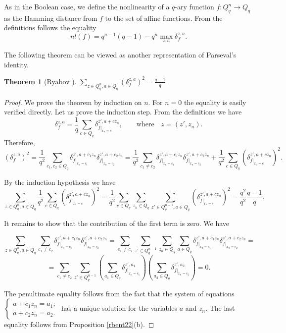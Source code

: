 \documentclass[11pt]{article}
\newtheorem{theorem}{Theorem}[section]
\theoremstyle{definition}
\begin{document}
{{{As in the Boolean case, we define the nonlinearity of a $q$-ary
function $f:Q_q^n\rightarrow Q_q$ as the Hamming distance from $f$ to
the set of affine functions. From the definitions follows the equality
\begin{equation}\label{eqplat1}
nl(f)=q^{n-1}(q-1)-q^n\max\limits_{z,a}\delta^{z,a}_f.
\end{equation}

The following theorem can be viewed as another representation of Parseval's identity.

\begin{theorem}[Ryabov \cite{Ryabov20}]\label{rbent1}
$\sum\limits_{z\in Q^n_q ,a\in
Q_q}(\delta^{z,a}_f)^2=\frac{q-1}{q}$.
\end{theorem}
\begin{proof}
We prove the theorem by induction on $n$. For $n=0$ the equality is easily verified
directly. Let us prove the induction step. From the definitions we have
$$\delta^{z,a}_f=\frac1q\sum\limits_{c\in
Q_q}\delta_{f|_{x_n=c}}^{z',a+cz_n},\qquad \text{where}\quad
z=(z',z_n).$$ Therefore,
$$(\delta^{z,a}_f)^2=\frac{1}{q^2}\sum\limits_{c_1,c_2\in
Q_q}\delta_{f|_{x_n=c_1}}^{z',a+c_1z_n}\delta_{f|_{x_n=c_2}}^{z',a+c_2z_n}=
\frac{1}{q^2}\sum\limits_{c_1\neq c_2
}\delta_{f|_{x_n=c_1}}^{z',a+c_1z_n}\delta_{f|_{x_n=c_2}}^{z',a+c_2z_n}+
\frac{1}{q^2}\sum\limits_{c\in
Q_q}(\delta_{f|_{x_n=c}}^{z',a+cz_n})^2.$$

By the induction hypothesis we have
 $$\sum\limits_{z\in Q^n_q ,a\in
Q_q}\frac{1}{q^2}\sum\limits_{c\in
Q_q}(\delta_{f|_{x_n=c}}^{z',a+cz_n})^2=\frac{1}{q^2}\sum\limits_{c\in
Q_q}\sum\limits_{z_n\in Q_q}\sum\limits_{z'\in Q^{n-1}_q ,a\in
Q_q}(\delta_{f|_{x_n=c}}^{z',a+cz_n})^2=\frac{q^2}{q^2}\frac{q-1}{q}.$$

It remains to show that the contribution of the first term is zero. We have

$$\sum\limits_{z\in Q^n_q ,a\in
Q_q}\sum\limits_{c_1\neq c_2
}\delta_{f|_{x_n=c_1}}^{z',a+c_1z_n}\delta_{f|_{x_n=c_2}}^{z',a+c_2z_n}=
\sum\limits_{c_1\neq c_2 }\sum\limits_{z'\in Q^{n-1}_q
}\sum\limits_{z_n\in Q_q }\sum\limits_{a\in
Q_q}\delta_{f|_{x_n=c_1}}^{z',a+c_1z_n}\delta_{f|_{x_n=c_2}}^{z',a+c_2z_n}=$$
$$=\sum\limits_{c_1\neq c_2 }\sum\limits_{z'\in Q^{n-1}_q
}\left(\sum\limits_{a_1\in
Q_q}\delta_{f|_{x_n=c_1}}^{z',a_1}\right)\left(\sum\limits_{a_2\in
Q_q}\delta_{f|_{x_n=c_2}}^{z',a_2}\right)=0.$$

The penultimate equality follows from the fact that the system of equations
$
\left\{
\begin{array}{l}
a+c_1z_n=a_1;\\
a+c_2z_n=a_2.
\end{array}
\right.$ has a unique solution for the variables $a$ and $z_n$.
The last equality follows from Proposition \ref{rbent22}(b).
\end{proof}

}}}
\end{document}
